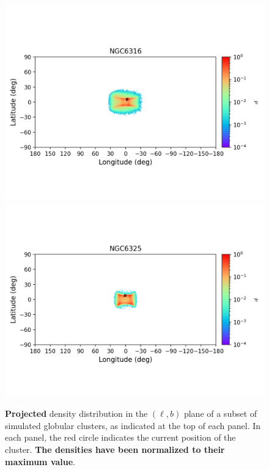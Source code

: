 \begin{figure}
        \includegraphics[clip=true, trim = 0mm 20mm 0mm 10mm, width=1\columnwidth]{images/error_plots_NGC6316.png}
        \includegraphics[clip=true, trim = 0mm 20mm 0mm 10mm, width=1\columnwidth]{images/error_plots_NGC6325.png}
        \caption[]{\textbf{Projected} density distribution in the $(\ell, b)$ plane of a subset of simulated globular clusters, as indicated at the top of each panel. In each panel, the red circle indicates the current position of the cluster. \textbf{The densities have been normalized to their maximum value}.}\label{stream9}
        \end{figure}
